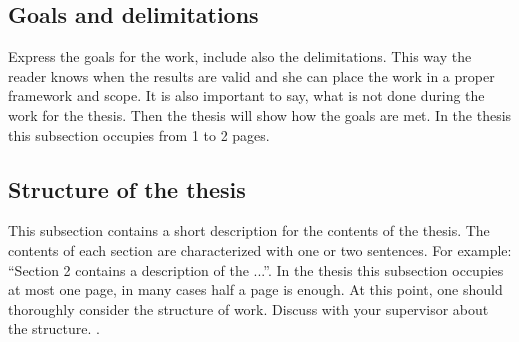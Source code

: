 \clearpage

\subsection[GOALS AND DELIMITATIONS]{Goals and delimitations}

\par Express the goals for the work, include also the delimitations. This way the reader knows when the results are valid and she can place the work in a proper framework and scope. It is also important to say, what is not done during the work for the thesis. Then the thesis will show how the goals are met. In the thesis this subsection occupies from 1 to 2 pages.

\subsection[STRUCTURE OF THE THESIS]{Structure of the thesis}

\par This subsection contains a short description for the contents of the thesis. The contents of each section are characterized with one or two sentences. For example: ``Section 2 contains a description of the ...''. In the thesis this subsection occupies at most one page, in many cases half a page is enough. At this point, one should thoroughly consider the structure of work. Discuss with your supervisor about the structure.
\citep{Dur00}.
